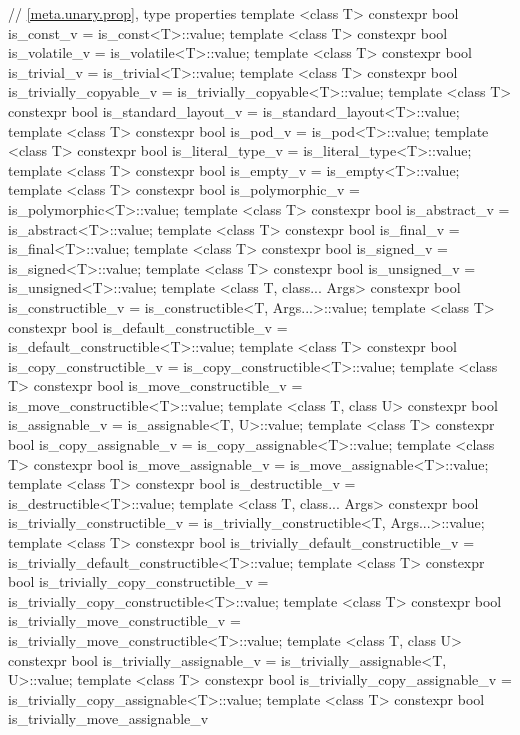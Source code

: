 \begin{codeblock}
{  // \ref{meta.unary.prop}, type properties
  template <class T> constexpr bool is_const_v
    = is_const<T>::value;
  template <class T> constexpr bool is_volatile_v
    = is_volatile<T>::value;
  template <class T> constexpr bool is_trivial_v
    = is_trivial<T>::value;
  template <class T> constexpr bool is_trivially_copyable_v
    = is_trivially_copyable<T>::value;
  template <class T> constexpr bool is_standard_layout_v
    = is_standard_layout<T>::value;
  template <class T> constexpr bool is_pod_v
    = is_pod<T>::value;
  template <class T> constexpr bool is_literal_type_v
    = is_literal_type<T>::value;
  template <class T> constexpr bool is_empty_v
    = is_empty<T>::value;
  template <class T> constexpr bool is_polymorphic_v
    = is_polymorphic<T>::value;
  template <class T> constexpr bool is_abstract_v
    = is_abstract<T>::value;
  template <class T> constexpr bool is_final_v
    = is_final<T>::value;
  template <class T> constexpr bool is_signed_v
    = is_signed<T>::value;
  template <class T> constexpr bool is_unsigned_v
    = is_unsigned<T>::value;
  template <class T, class... Args> constexpr bool is_constructible_v
    = is_constructible<T, Args...>::value;
  template <class T> constexpr bool is_default_constructible_v
    = is_default_constructible<T>::value;
  template <class T> constexpr bool is_copy_constructible_v
    = is_copy_constructible<T>::value;
  template <class T> constexpr bool is_move_constructible_v
    = is_move_constructible<T>::value;
  template <class T, class U> constexpr bool is_assignable_v
    = is_assignable<T, U>::value;
  template <class T> constexpr bool is_copy_assignable_v
    = is_copy_assignable<T>::value;
  template <class T> constexpr bool is_move_assignable_v
    = is_move_assignable<T>::value;
  template <class T> constexpr bool is_destructible_v
    = is_destructible<T>::value;
  template <class T, class... Args> constexpr bool is_trivially_constructible_v
    = is_trivially_constructible<T, Args...>::value;
  template <class T> constexpr bool is_trivially_default_constructible_v
    = is_trivially_default_constructible<T>::value;
  template <class T> constexpr bool is_trivially_copy_constructible_v
    = is_trivially_copy_constructible<T>::value;
  template <class T> constexpr bool is_trivially_move_constructible_v
    = is_trivially_move_constructible<T>::value;
  template <class T, class U> constexpr bool is_trivially_assignable_v
    = is_trivially_assignable<T, U>::value;
  template <class T> constexpr bool is_trivially_copy_assignable_v
    = is_trivially_copy_assignable<T>::value;
  template <class T> constexpr bool is_trivially_move_assignable_v
}
\end{codeblock}
